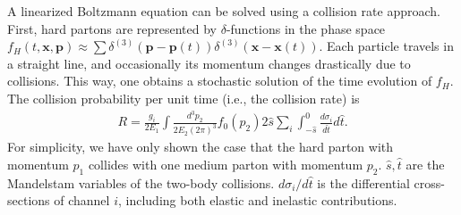 \documentclass[aps, prc, reprint, amsmath, groupedaddress, nofootinbib]{revtex4-1}
\begin{document}
A linearized Boltzmann equation can be solved using a collision rate approach.
First, hard partons are represented by $\delta$-functions in the phase space $f_H(t,\mathbf{x},\mathbf{p}) \approx \sum \delta^{(3)}(\mathbf{p}-\mathbf{p}(t))\delta^{(3)}(\mathbf{x}-\mathbf{x}(t))$.
Each particle travels in a straight line, and occasionally its momentum changes drastically due to collisions.
This way, one obtains a stochastic solution of the time evolution of $f_H$.
The collision probability per unit time (i.e., the collision rate) is 
\begin{eqnarray}
R = \frac{g_i}{2E_1}\int  \frac{d^3p_2}{2E_2(2\pi)^3} f_0(p_2)2\hat{s} \sum_i \int_{-\hat{s}}^{0}\frac{d\sigma_i}{d\hat{t}}d\hat{t}.
\label{eq:incoh_rate}
\end{eqnarray}
For simplicity, we have only shown the case that the hard parton with momentum $p_1$ collides with one medium parton with momentum $p_2$.
$\hat{s}, \hat{t}$ are the Mandelstam variables of the two-body collisions. 
$d\sigma_i/d\hat{t}$ is the differential cross-sections of channel $i$, including both elastic and inelastic contributions.
\end{document}
